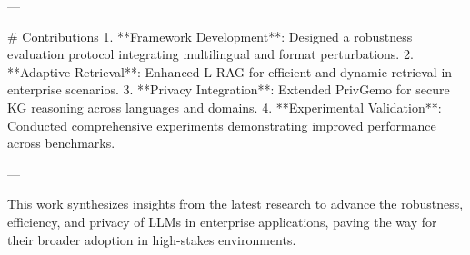 ---

# Contributions  
1. **Framework Development**: Designed a robustness evaluation protocol integrating multilingual and format perturbations.  
2. **Adaptive Retrieval**: Enhanced L-RAG for efficient and dynamic retrieval in enterprise scenarios.  
3. **Privacy Integration**: Extended PrivGemo for secure KG reasoning across languages and domains.  
4. **Experimental Validation**: Conducted comprehensive experiments demonstrating improved performance across benchmarks.  

--- 

This work synthesizes insights from the latest research to advance the robustness, efficiency, and privacy of LLMs in enterprise applications, paving the way for their broader adoption in high-stakes environments.